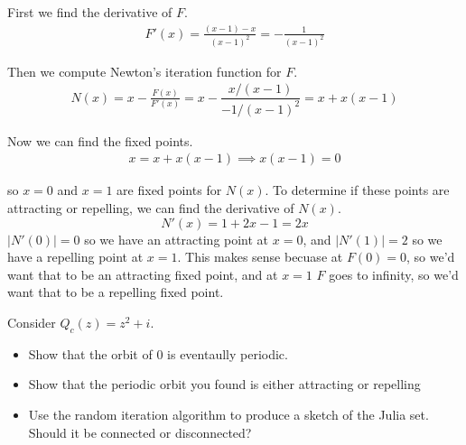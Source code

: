 \documentclass[12pt]{article}
\newenvironment{problem}[2][Problem]{\begin{trivlist}
\item[\hskip \labelsep {\bfseries #1} \hskip \labelsep {\bfseries #2.}]}{\end{trivlist}}
\begin{document}
First we find the derivative of $F$.
\begin{align*}
	F'(x) = \frac{(x-1) - x}{(x-1)^2} = -\frac{1}{(x-1)^2}
\end{align*}

Then we compute Newton's iteration function for $F$.
\begin{align*}
	N(x) = x - \frac{F(x)}{F'(x)} = x - \dfrac{x/(x-1)}{-1/(x-1)^2} = x + x(x - 1)
\end{align*}

Now we can find the fixed points.
\begin{align*}
	x = x + x(x-1) \implies x(x-1) = 0
\end{align*}

so $x = 0$ and $x = 1$ are fixed points for $N(x)$. To determine if these points are attracting or repelling, we can find the derivative of $N(x)$.
\[
	N'(x) = 1 + 2x - 1 = 2x
\]
$|N'(0)| = 0$ so we have an attracting point at $x=0$, and $|N'(1)| = 2$ so we have a repelling point at $x = 1$. This makes sense becuase at $F(0) = 0$, so we'd want that to be an attracting fixed point, and at $x = 1$ $F$ goes to infinity, so we'd want that to be a repelling fixed point.
\begin{tcolorbox}[colback=blue!5!white,colframe=blue!75!black]
	\begin{problem}{6}
		Consider $Q_c(z) = z^2 + i$.
		\begin{itemize}
			\item[(a)] Show that the orbit of 0 is eventaully periodic.
			\item[(b)] Show that the periodic orbit you found is either attracting or repelling
			\item[(c)] Use the random iteration algorithm to produce a sketch of the Julia set. Should it be connected or disconnected?
		\end{itemize}
	\end{problem}	
\end{tcolorbox}
\end{document}
